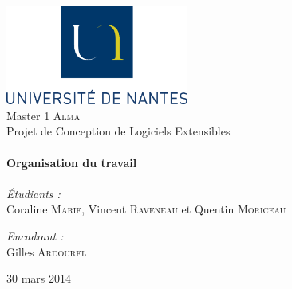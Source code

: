 
\begin{titlepage}
\begin{center}

\includegraphics[width=0.45\textwidth]{../figures/logoUN.png}~\\[2cm]

\LARGE{Master 1 \textsc{Alma}}\\[1.5cm]

\Large{Projet de Conception de Logiciels Extensibles}\\[0.5cm]

\HRule \\[0.4cm]
{ \huge \bfseries Organisation du travail \\[0.4cm] }
\HRule \\[1.5cm]

\normalsize	
\emph{\'Etudiants :}\\
Coraline \textsc{Marie}, Vincent \textsc{Raveneau} et Quentin \textsc{Moriceau}

\vspace{0.5cm}

\emph{Encadrant :} \\
Gilles \textsc{Ardourel}

\vfill

{\large 30 mars 2014}

\end{center}
\end{titlepage}

